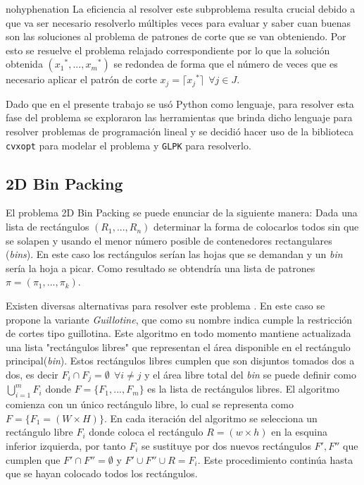 \documentclass[a4paper,10pt,twocolumn]{article}
\begin{document}
\begin{hyphenrules}{nohyphenation}
La eficiencia al resolver este subproblema resulta crucial debido a que va ser necesario resolverlo múltiples veces para evaluar y saber cuan buenas son las soluciones al problema de patrones de corte que se van obteniendo. Por esto se resuelve el problema relajado correspondiente por lo que la solución obtenida $({x_1}^*,...,{x_m}^*)$ se redondea de forma que el número de veces que es necesario aplicar el patrón de corte $x_j = \lceil {x_j}^* \rceil \ \ \forall j \in J$.

Dado que en el presente trabajo se usó Python como lenguaje, para resolver esta fase del problema se exploraron las herramientas que brinda dicho lenguaje para resolver problemas de programación lineal y se decidió hacer uso de la biblioteca \texttt{cvxopt} para modelar el problema y \texttt{GLPK} para resolverlo.

\subsection{2D Bin Packing} \label{binpacking}
El problema 2D Bin Packing se puede enunciar de la siguiente manera: Dada una lista de rectángulos $(R_1,...,R_n)$ determinar la forma de colocarlos todos sin que se solapen y usando el menor número posible de contenedores rectangulares (\textit{bins}). En este caso los rectángulos serían las hojas que se demandan y un \textit{bin} sería la hoja a picar. Como resultado se obtendría una lista de patrones $\pi = (\pi_1,...,\pi_k)$.

Existen diversas alternativas para resolver este problema \cite{11}. En este caso se propone la variante \textit{Guillotine}, que como su nombre indica cumple la restricción de cortes tipo guillotina. Este algoritmo en todo momento mantiene actualizada una lista "rectángulos libres" que representan el área disponible en el rectángulo principal(\textit{bin}). Estos rectángulos libres cumplen que son disjuntos tomados dos a dos, es decir $F_i \cap F_j = \emptyset \ \ \forall i\neq j $ y el área libre total del \textit{bin} se puede definir como $\bigcup\limits_{i=1}^{m} F_{i}$ donde $F = \{F_1,...,F_m\}$ es la lista de rectángulos libres. El algoritmo comienza con un único rectángulo libre, lo cual se representa como $F = \{F_1 = (W \times H)\}$. En cada iteración del algoritmo se selecciona un rectángulo libre $F_i$ donde coloca el rectángulo $R = (w \times h)$ en la esquina inferior izquierda, por tanto $F_i$ se sustituye por dos nuevos rectángulos $F',F''$ que cumplen que $F' \cap F'' = \emptyset$ y $F' \cup F'' \cup R = F_i$. Este procedimiento continúa hasta que se hayan colocado todos los rectángulos.


\end{hyphenrules}
\end{document}
